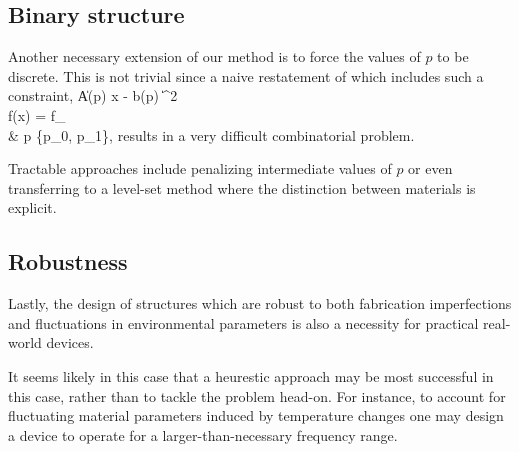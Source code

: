 \subsection{Binary structure}
Another necessary extension of our method is to force 
    the values of $p$ to be discrete.
This is not trivial since a naive restatement of 
    which includes such a constraint,
\BA {} \| A(p) x - b(p) \|^2 \notag \\
    \subto f(x) = f_ \\
        & p \in \{p_0, p_1\}, \notag \EA
    results in a very difficult combinatorial problem.

Tractable approaches include penalizing intermediate values of $p$ \cite{simp}
    or even transferring to a level-set method \cite{miller}
    where the distinction between materials is explicit.

\subsection{Robustness}
Lastly, the design of structures which are robust to both
    fabrication imperfections and fluctuations in environmental parameters
    is also a necessity for practical real-world devices.

It seems likely in this case that a heurestic approach may
    be most successful in this case, rather than to tackle 
    the problem head-on.
For instance, to account for fluctuating material parameters
    induced by temperature changes
    one may design a device to operate for a larger-than-necessary 
    frequency range.

